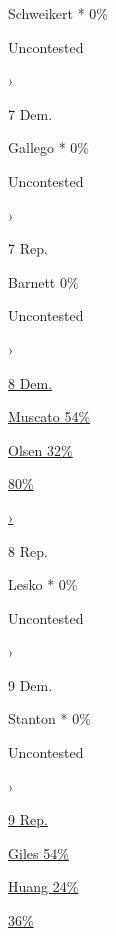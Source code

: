  Schweikert * 0\%

Uncontested

›

7 Dem.

 Gallego * 0\%

Uncontested

›

7 Rep.

 Barnett 0\%

Uncontested

›

\href{https://www.nytimes3xbfgragh.onion/interactive/2020/08/04/us/elections/results-arizona-house-district-8-primary-election.html}{8
Dem.}

\href{https://www.nytimes3xbfgragh.onion/interactive/2020/08/04/us/elections/results-arizona-house-district-8-primary-election.html}{
Muscato 54\% }

\href{https://www.nytimes3xbfgragh.onion/interactive/2020/08/04/us/elections/results-arizona-house-district-8-primary-election.html}{
Olsen 32\% }

\href{https://www.nytimes3xbfgragh.onion/interactive/2020/08/04/us/elections/results-arizona-house-district-8-primary-election.html}{80\%}

\href{https://www.nytimes3xbfgragh.onion/interactive/2020/08/04/us/elections/results-arizona-house-district-8-primary-election.html}{›}

8 Rep.

 Lesko * 0\%

Uncontested

›

9 Dem.

 Stanton * 0\%

Uncontested

›

\href{https://www.nytimes3xbfgragh.onion/interactive/2020/08/04/us/elections/results-arizona-house-district-9-primary-election.html}{9
Rep.}

\href{https://www.nytimes3xbfgragh.onion/interactive/2020/08/04/us/elections/results-arizona-house-district-9-primary-election.html}{
Giles 54\% }

\href{https://www.nytimes3xbfgragh.onion/interactive/2020/08/04/us/elections/results-arizona-house-district-9-primary-election.html}{
Huang 24\% }

\href{https://www.nytimes3xbfgragh.onion/interactive/2020/08/04/us/elections/results-arizona-house-district-9-primary-election.html}{36\%}

